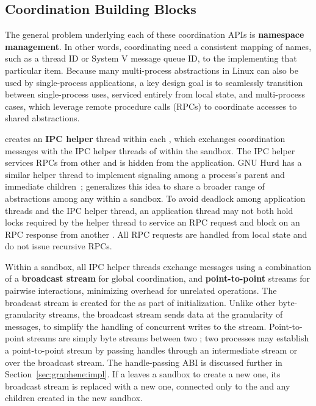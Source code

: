 \subsection{Coordination Building Blocks}
\label{sec:graphene:namespaces:blocks}

The general problem underlying each of these coordination APIs is 
{\bf namespace management}.  In other words, coordinating \picoprocs{} need 
a consistent mapping of names, such as a thread ID or System V message queue ID, 
to the \picoproc{} implementing that particular item.  
Because many multi-process abstractions in Linux can also be used by single-process applications,
a key design goal is to seamlessly transition between single-process uses, serviced 
entirely from local \libos{} state, and multi-process cases, which
leverage remote procedure calls (RPCs) to coordinate accesses to shared abstractions.


\graphene{} creates an  {\bf IPC helper} thread within each \picoproc{},
which exchanges coordination messages with the IPC helper threads of \picoprocs{} 
within the sandbox. %
The IPC helper
services RPCs from other \picoprocs{} and is
hidden from the application. 
GNU Hurd has a similar helper thread to implement signaling among a process's parent and
immediate children~\cite{hurd};
\graphene{} generalizes this idea to share a broader range of abstractions among any \picoprocs{}
within a sandbox.
To avoid deadlock among application threads and the IPC helper thread, 
an application thread may not both hold locks required by the helper thread to service an RPC request
and block
on an RPC response from another \picoproc{}.
All RPC requests are handled from local state and do not issue recursive RPCs.%

Within a sandbox, all IPC helper threads exchange messages using a
combination of a {\bf broadcast stream} for global coordination,
and {\bf point-to-point} streams for pairwise interactions, 
minimizing overhead for unrelated operations.
The broadcast stream is created for the \picoproc{} as part of initialization.
Unlike other byte-granularity streams, the broadcast stream sends data at the granularity of messages,
to simplify the handling of concurrent writes to the stream.
Point-to-point streams are simply byte streams between two \picoprocs{};
two processes may establish a point-to-point stream by passing handles through 
an intermediate stream or over the broadcast stream.
The handle-passing ABI is discussed further in Section~\ref{sec:graphene:impl}.
If a \picoproc{} leaves a sandbox to create a new one,
its broadcast stream is replaced
with a new one, connected only to the \picoproc{} and any children created in the
new sandbox.

